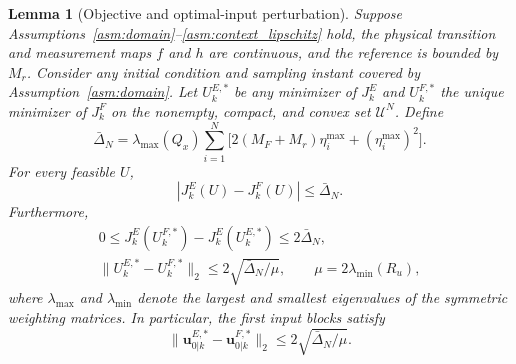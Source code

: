 \documentclass[journal]{IEEEtran}
\newcommand{\vu}{\mathbf{u}}
\newcommand{\norm}[2][]{\mathopen{#1\lVert}#2\mathclose{#1\rVert}}
\theoremstyle{plain}
\newtheorem{lemma}{Lemma}
\theoremstyle{definition}
\theoremstyle{definition}
\begin{document}
\begin{lemma}[Objective and optimal-input perturbation]
\label{lem:objective_policy_perturbation}
Suppose Assumptions~\ref{asm:domain}--\ref{asm:context_lipschitz}
hold, the physical transition and measurement maps $f$ and $h$
are continuous, and the reference is bounded by $M_r$. Consider any
initial condition and sampling instant covered by
Assumption~\ref{asm:domain}. Let $U_k^{E,*}$ be any minimizer of
$J_k^E$ and $U_k^{F,*}$ the unique minimizer of $J_k^F$ on the
nonempty, compact, and convex set $\mathcal U^N$.
Define
\begin{equation}
\bar\Delta_N=\lambda_{\max}(Q_x)\sum_{i=1}^N
\Big[2(M_F+M_r)\eta_i^{\max}+(\eta_i^{\max})^2\Big].
\label{eq:uniform_cost_perturbation}
\end{equation}
For every feasible $U$,
\begin{equation}
|J_k^E(U)-J_k^F(U)|\le\bar\Delta_N.
\label{eq:cost_perturbation_sum}
\end{equation}
Furthermore,
\begin{gather}
0\le J_k^E(U_k^{F,*})-J_k^E(U_k^{E,*})\le2\bar\Delta_N,
\label{eq:ideal_suboptimality}\\
\norm{U_k^{E,*}-U_k^{F,*}}_2\le2\sqrt{\bar\Delta_N/\mu},
\qquad \mu=2\lambda_{\min}(R_u),
\label{eq:optimal_input_perturbation}
\end{gather}
where $\lambda_{\max}$ and $\lambda_{\min}$ denote the largest and
smallest eigenvalues of the symmetric weighting matrices. In
particular, the first input blocks satisfy
\begin{equation}
\norm{\vu_{0|k}^{E,*}-\vu_{0|k}^{F,*}}_2
\le2\sqrt{\bar\Delta_N/\mu}.
\label{eq:first_input_perturbation}
\end{equation}
\end{lemma}
\end{document}

